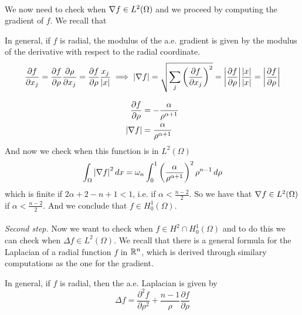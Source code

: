 \vspace{0.1cm}\\
We now need to check when \(\nabla f \in L^2(\Omega)\) and we proceed by computing the gradient of \(f\).
We recall that
\begin{remark}
    In general, if \(f\) is radial, the modulus of the a.e. gradient is given by the modulus of the derivative with respect to the radial coordinate.
    \begin{equation*}
        \frac{\partial f}{\partial x_j} = \frac{\partial f}{\partial \rho} \frac{\partial \rho}{\partial x_j} = \frac{\partial f}{\partial \rho} \frac{x_j}{\abs{x}}
        \implies \abs{\nabla f} = \sqrt{\sum_j \left(\frac{\partial f}{\partial x_j}\right)^2} = \abs{\frac{\partial f}{\partial \rho}} \frac{\abs{x}}{\abs{x}} = \abs{\frac{\partial f}{\partial \rho}}
    \end{equation*}
\end{remark}
\begin{align*}
    \frac{\partial f}{\partial \rho} & = -\frac{\alpha}{\rho^{\alpha+1}} \\
    \abs{\nabla f}                    & = \frac{\alpha}{\rho^{\alpha+1}}
\end{align*}
And now we check when this function is in \(L^2(\Omega)\)
\begin{align*}
    \int_\Omega \abs{\nabla f}^2 \, dx = \omega_n \int_0^1 \left(\frac{\alpha}{\rho^{\alpha+1}}\right)^2 \rho^{n-1}\, d\rho
\end{align*}
which is finite if $2\alpha+2-n+1<1$, i.e. if $\alpha < \frac{n-2}{2}$.
So we have that \(\nabla f \in L^2(\Omega)\) if \(\alpha < \frac{n-2}{2}\).
And we conclude that \(f \in H^1_0(\Omega)\).\\
\vspace{0.1cm}\\
\textit{Second step.} Now we want to check when \(f \in H^2\cap H^1_0(\Omega)\)
and to do this we can check when \(\Delta f \in L^2(\Omega)\).
We recall that there is a general formula for the Laplacian of a radial function \(f\) in \(\mathbb{R}^n\),
which is derived through similary computations as the one for the gradient.
\begin{remark}
    In general, if \(f\) is radial, then the a.e. Laplacian is given by
    \begin{equation*}
        \Delta f = \frac{\partial^2 f}{\partial \rho^2} + \frac{n-1}{\rho} \frac{\partial f}{\partial \rho}
    \end{equation*}
\end{remark}
